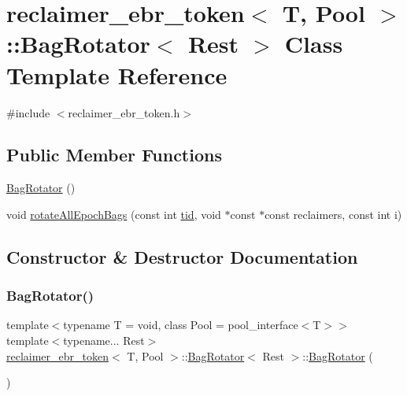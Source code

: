 \hypertarget{classreclaimer__ebr__token_1_1BagRotator}{}\section{reclaimer\+\_\+ebr\+\_\+token$<$ T, Pool $>$\+:\+:Bag\+Rotator$<$ Rest $>$ Class Template Reference}
\label{classreclaimer__ebr__token_1_1BagRotator}


{\ttfamily \#include $<$reclaimer\+\_\+ebr\+\_\+token.\+h$>$}

\subsection*{Public Member Functions}
\begin{DoxyCompactItemize}
\item 
\hyperlink{classreclaimer__ebr__token_1_1BagRotator_af29d070d9880f97b6f34de623c1690e1}{Bag\+Rotator} ()
\item 
void \hyperlink{classreclaimer__ebr__token_1_1BagRotator_af0eeccfb61bdb4ca3e7f4282282d18e1}{rotate\+All\+Epoch\+Bags} (const int \hyperlink{microbench_2main_8cpp_a9ca9869868fe7e7a38a921cc7de4103f}{tid}, void $\ast$const $\ast$const reclaimers, const int i)
\end{DoxyCompactItemize}


\subsection{Constructor \& Destructor Documentation}
\mbox{\label{classreclaimer__ebr__token_1_1BagRotator_af29d070d9880f97b6f34de623c1690e1}} 
\subsubsection{\texorpdfstring{Bag\+Rotator()}{BagRotator()}}
{\footnotesize\ttfamily template$<$typename T  = void, class Pool  = pool\+\_\+interface$<$\+T$>$$>$ \\
template$<$typename... Rest$>$ \\
\hyperlink{classreclaimer__ebr__token}{reclaimer\+\_\+ebr\+\_\+token}$<$ T, Pool $>$\+::\hyperlink{classreclaimer__ebr__token_1_1BagRotator}{Bag\+Rotator}$<$ Rest $>$\+::\hyperlink{classreclaimer__ebr__token_1_1BagRotator}{Bag\+Rotator} (\begin{DoxyParamCaption}{ }\end{DoxyParamCaption})\hspace{0.3cm}{\ttfamily [inline]}}



